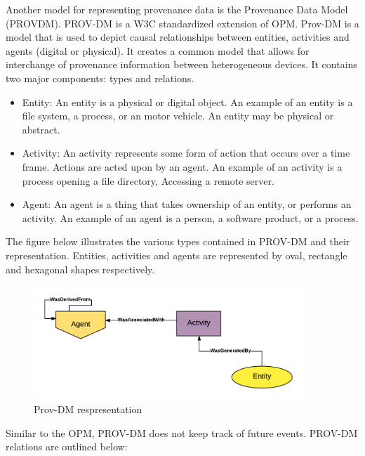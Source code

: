 Another model for representing provenance data is the Provenance Data Model (PROV\-DM). PROV-DM is a W3C standardized extension of OPM. Prov-DM is a model that is used to depict causal relationships between entities, activities and agents (digital or physical).  It creates a common model that allows for interchange of provenance information between heterogeneous devices. It contains two major components: types and relations. 


\begin{itemize}

\item Entity: An entity is a physical or digital object. An example of an entity is a file system, a process, or an motor vehicle. An entity may be physical or abstract.

\item Activity: An activity represents some form of action that occurs over a time frame. Actions are acted upon by an agent. An example of an activity is a process opening a file directory, Accessing a remote server.

\item Agent: An agent is a thing that takes ownership of an entity, or performs an activity. An example of an agent is a person, a software product, or a process.
\end{itemize}

The figure below illustrates the various types contained in PROV-DM and their representation. Entities, activities and agents are represented by oval, rectangle and hexagonal shapes respectively.

\begin{figure}[h]
\begin{center}

\includegraphics[width=4.0in]{prov_dm_1.PNG}
\end{center}
\caption{Prov-DM respresentation }
\end{figure}

Similar to the OPM, PROV-DM does not keep track of future events. PROV-DM relations are outlined below:


